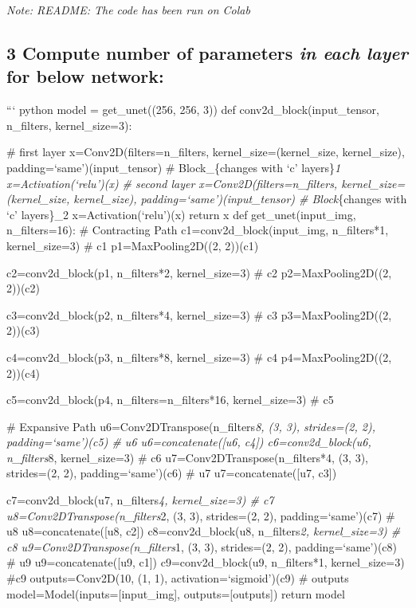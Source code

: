 \documentclass[11pt]{article}
\begin{document}
    \emph{Note: README: The code has been run on Colab}

    \hypertarget{compute-number-of-parameters-in-each-layer-for-below-network}{%
\subsection{\texorpdfstring{3 Compute number of parameters \emph{in each
layer} for below
network:}{3 Compute number of parameters in each layer for below network:}}\label{compute-number-of-parameters-in-each-layer-for-below-network}}

``` python model = get\_unet((256, 256, 3)) def
conv2d\_block(input\_tensor, n\_filters, kernel\_size=3):

\# first layer x=Conv2D(filters=n\_filters, kernel\_size=(kernel\_size,
kernel\_size), padding=`same')(input\_tensor) \# Block\_\{changes with
`c' layers\}\emph{1 x=Activation(`relu')(x) \# second layer
x=Conv2D(filters=n\_filters, kernel\_size=(kernel\_size, kernel\_size),
padding=`same')(input\_tensor) \# Block}\{changes with `c' layers\}\_2
x=Activation(`relu')(x) return x def get\_unet(input\_img,
n\_filters=16): \# Contracting Path c1=conv2d\_block(input\_img,
n\_filters*1, kernel\_size=3) \# c1 p1=MaxPooling2D((2, 2))(c1)

c2=conv2d\_block(p1, n\_filters*2, kernel\_size=3) \# c2
p2=MaxPooling2D((2, 2))(c2)

c3=conv2d\_block(p2, n\_filters*4, kernel\_size=3) \# c3
p3=MaxPooling2D((2, 2))(c3)

c4=conv2d\_block(p3, n\_filters*8, kernel\_size=3) \# c4
p4=MaxPooling2D((2, 2))(c4)

c5=conv2d\_block(p4, n\_filters=n\_filters*16, kernel\_size=3) \# c5

\# Expansive Path u6=Conv2DTranspose(n\_filters\emph{8, (3, 3),
strides=(2, 2), padding=`same')(c5) \# u6 u6=concatenate({[}u6, c4{]})
c6=conv2d\_block(u6, n\_filters}8, kernel\_size=3) \# c6
u7=Conv2DTranspose(n\_filters*4, (3, 3), strides=(2, 2),
padding=`same')(c6) \# u7 u7=concatenate({[}u7, c3{]})

c7=conv2d\_block(u7, n\_filters\emph{4, kernel\_size=3) \# c7
u8=Conv2DTranspose(n\_filters}2, (3, 3), strides=(2, 2),
padding=`same')(c7) \# u8 u8=concatenate({[}u8, c2{]})
c8=conv2d\_block(u8, n\_filters\emph{2, kernel\_size=3) \# c8
u9=Conv2DTranspose(n\_filters}1, (3, 3), strides=(2, 2),
padding=`same')(c8) \# u9 u9=concatenate({[}u9, c1{]})
c9=conv2d\_block(u9, n\_filters*1, kernel\_size=3) \#c9
outputs=Conv2D(10, (1, 1), activation=`sigmoid')(c9) \# outputs
model=Model(inputs={[}input\_img{]}, outputs={[}outputs{]}) return model
\end{document}
